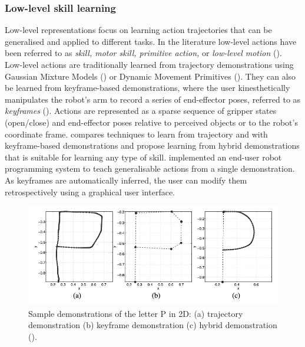 \subsubsection{Low-level skill learning}\label{ssec:lowlevel}
Low-level representations focus on learning action trajectories that can be generalised and applied to different tasks.
In the literature low-level actions have been referred to as \textit{skill, motor skill, primitive action,} or \textit{low-level motion} (\cite{chernova2014robot}).
Low-level actions are traditionally learned from trajectory demonstrations using Gaussian Mixture Models (\cite{billard2008robot}) or Dynamic Movement Primitives (\cite{pastor2009learning}).
They can also be learned from keyframe-based demonstrations, %
where the user kinesthetically manipulates the robot's arm to record a series of end-effector poses, referred to as \textit{keyframes} (\cite{akgun2012keyframe}). 
Actions are represented as a sparse sequence of gripper states (open/close) and end-effector poses relative to perceived objects or to the robot's coordinate frame.
\cite{akgun2012keyframe} compares techniques to learn from trajectory and with keyframe-based demonstrations and propose learning from hybrid demonstrations that is suitable for learning any type of skill.
\cite{alexandrova2014robot} implemented an end-user robot programming system to teach generalisable actions from a single demonstration. 
As keyframes are automatically inferred, the user can modify them retrospectively using a graphical user interface.

\begin{figure}[!h]
	\centering
	\includegraphics[width=0.7\linewidth]{figures/kLfd}
	\caption{Sample demonstrations of the letter P in 2D: (a) trajectory demonstration (b) keyframe demonstration (c) hybrid demonstration (\cite{akgun2012keyframe}).}
	\label{fig:lowlevel}
\end{figure} 

